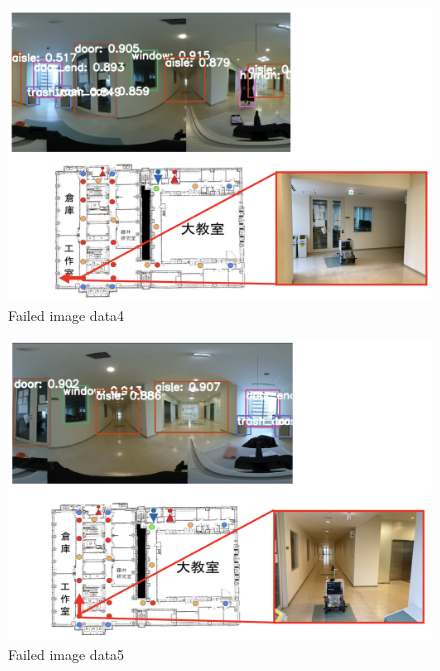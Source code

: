 \documentclass[../main]{subfiles}
\begin{document}
        \begin{figure}[H]
            \centering
            \includegraphics[scale=0.5]{../images/experiment_failed4.png}
            \caption{Failed image data4}
            \label{figure::experiment_failed4}
        \end{figure}  

        \begin{figure}[H]
            \centering
            \includegraphics[scale=0.5]{../images/experiment_failed5.png}
            \caption{Failed image data5}
            \label{figure::experiment_failed5}
        \end{figure}  



        
\end{document}
